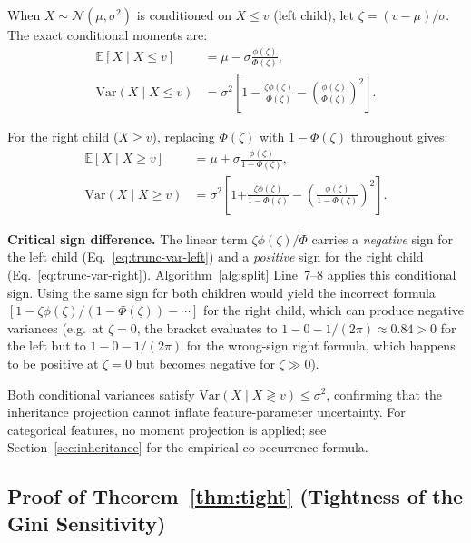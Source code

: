 \documentclass{article}
\begin{document}
When $X \sim \mathcal{N}(\mu, \sigma^2)$ is conditioned on $X \leq v$
(left child), let $\zeta = (v-\mu)/\sigma$. The exact conditional
moments are:
\begin{align}
  \mathbb{E}[X \mid X \leq v]
    &= \mu - \sigma\frac{\phi(\zeta)}{\Phi(\zeta)}, \label{eq:trunc-mean-left}\\
  \mathrm{Var}(X \mid X \leq v)
    &= \sigma^2\!\left[1 - \frac{\zeta\phi(\zeta)}{\Phi(\zeta)}
      - \left(\frac{\phi(\zeta)}{\Phi(\zeta)}\right)^{\!2}\right].
      \label{eq:trunc-var-left}
\end{align}

For the right child ($X \geq v$), replacing $\Phi(\zeta)$ with
$1{-}\Phi(\zeta)$ throughout gives:
\begin{align}
  \mathbb{E}[X \mid X \geq v]
    &= \mu + \sigma\frac{\phi(\zeta)}{1-\Phi(\zeta)}, \label{eq:trunc-mean-right}\\
  \mathrm{Var}(X \mid X \geq v)
    &= \sigma^2\!\left[1 \mathbf{+} \frac{\zeta\phi(\zeta)}{1-\Phi(\zeta)}
      - \left(\frac{\phi(\zeta)}{1-\Phi(\zeta)}\right)^{\!2}\right].
      \label{eq:trunc-var-right}
\end{align}

\noindent\textbf{Critical sign difference.}
The linear term $\zeta\phi(\zeta)/\tilde\Phi$ carries a \emph{negative}
sign for the left child (Eq.~\eqref{eq:trunc-var-left}) and a
\emph{positive} sign for the right child (Eq.~\eqref{eq:trunc-var-right}).
Algorithm~\ref{alg:split} Line~7--8 applies this conditional sign.
Using the same sign for both children would yield the incorrect formula
$[1 - \zeta\phi(\zeta)/(1{-}\Phi(\zeta)) - \cdots]$ for the right child,
which can produce negative variances (e.g.\ at $\zeta=0$, the bracket
evaluates to $1 - 0 - 1/(2\pi) \approx 0.84 > 0$ for the left but to
$1 - 0 - 1/(2\pi)$ for the wrong-sign right formula, which happens to be
positive at $\zeta=0$ but becomes negative for $\zeta \gg 0$).

Both conditional variances satisfy
$\mathrm{Var}(X \mid X \gtrless v) \leq \sigma^2$,
confirming that the inheritance projection cannot inflate
feature-parameter uncertainty. For categorical features, no moment
projection is applied; see Section~\ref{sec:inheritance} for the
empirical co-occurrence formula.

\subsection{Proof of Theorem~\ref{thm:tight} (Tightness of the Gini Sensitivity)}
\label{app:proof-tight}
\end{document}
